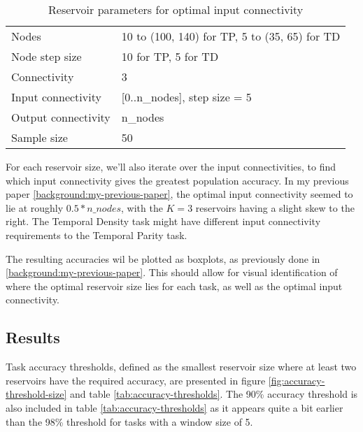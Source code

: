 \begin{table}[ht]
    \centering
    \caption{Reservoir parameters for optimal input connectivity}
    \label{tab:ic-reservoir-parameters}
    \begin{tabular}{ll}
        Nodes               & 10 to (100, 140) for TP, 5 to (35, 65) for TD \\
        Node step size      & 10 for TP, 5 for TD \\
        Connectivity        & 3                              \\
        Input connectivity  & [0..n\_nodes], step size = 5   \\
        Output connectivity & n\_nodes                       \\
        Sample size         & 50
    \end{tabular}
\end{table}

For each reservoir size, we'll also iterate over the input connectivities,
to find which input connectivity gives the greatest population accuracy.
In my previous paper \ref{background:my-previous-paper},
the optimal input connectivity seemed to lie at roughly $ 0.5*n\_nodes $,
with the $K=3$ reservoirs having a slight skew to the right.
The Temporal Density task might have different input connectivity requirements to the Temporal Parity task.

The resulting accuracies wil be plotted as boxplots, as previously done in \ref{background:my-previous-paper}.
This should allow for visual identification of where the optimal reservoir size lies for each task,
as well as the optimal input connectivity.

\subsection{Results}

Task accuracy thresholds,
defined as the smallest reservoir size where at least two reservoirs have the required accuracy,
are presented in figure \ref{fig:accuracy-threshold-size} and table \ref{tab:accuracy-thresholds}.
The 90\% accuracy threshold is also included in table \ref{tab:accuracy-thresholds} as it appears quite a bit earlier than the 98\% threshold for tasks with a window size of 5.

